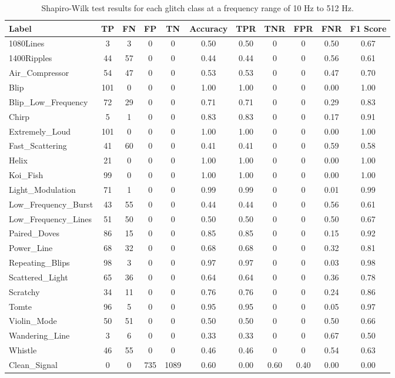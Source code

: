 \documentclass[12pt]{article}
\begin{document}
\begin{table}[H]
  \begin{tabular}{lcccccccccc}
  \toprule
  Label & TP & FN & FP & TN & Accuracy & TPR & TNR & FPR & FNR & F1 Score \\
  \midrule
  1080Lines & 3 & 3 & 0 & 0 & 0.50 & 0.50 & 0 & 0 & 0.50  & 0.67 \\
  1400Ripples & 44 & 57 & 0 & 0 & 0.44 & 0.44 & 0 & 0 & 0.56  & 0.61 \\
  Air\_Compressor & 54 & 47 & 0 & 0 & 0.53 & 0.53 & 0 & 0 & 0.47  & 0.70 \\
  Blip & 101 & 0 & 0 & 0 & 1.00 & 1.00 & 0 & 0 & 0.00  & 1.00 \\
  Blip\_Low\_Frequency & 72 & 29 & 0 & 0 & 0.71 & 0.71 & 0 & 0 & 0.29  & 0.83 \\
  Chirp & 5 & 1 & 0 & 0 & 0.83 & 0.83 & 0 & 0 & 0.17  & 0.91 \\
  Extremely\_Loud & 101 & 0 & 0 & 0 & 1.00 & 1.00 & 0 & 0 & 0.00  & 1.00 \\
  Fast\_Scattering & 41 & 60 & 0 & 0 & 0.41 & 0.41 & 0 & 0 & 0.59  & 0.58 \\
  Helix & 21 & 0 & 0 & 0 & 1.00 & 1.00 & 0 & 0 & 0.00  & 1.00 \\
  Koi\_Fish & 99 & 0 & 0 & 0 & 1.00 & 1.00 & 0 & 0 & 0.00  & 1.00 \\
  Light\_Modulation & 71 & 1 & 0 & 0 & 0.99 & 0.99 & 0 & 0 & 0.01  & 0.99 \\
  Low\_Frequency\_Burst & 43 & 55 & 0 & 0 & 0.44 & 0.44 & 0 & 0 & 0.56  & 0.61 \\
  Low\_Frequency\_Lines & 51 & 50 & 0 & 0 & 0.50 & 0.50 & 0 & 0 & 0.50  & 0.67 \\
  Paired\_Doves & 86 & 15 & 0 & 0 & 0.85 & 0.85 & 0 & 0 & 0.15  & 0.92 \\
  Power\_Line & 68 & 32 & 0 & 0 & 0.68 & 0.68 & 0 & 0 & 0.32  & 0.81 \\
  Repeating\_Blips & 98 & 3 & 0 & 0 & 0.97 & 0.97 & 0 & 0 & 0.03  & 0.98 \\
  Scattered\_Light & 65 & 36 & 0 & 0 & 0.64 & 0.64 & 0 & 0 & 0.36  & 0.78 \\
  Scratchy & 34 & 11 & 0 & 0 & 0.76 & 0.76 & 0 & 0 & 0.24  & 0.86 \\
  Tomte & 96 & 5 & 0 & 0 & 0.95 & 0.95 & 0 & 0 & 0.05 & 0.97 \\
  Violin\_Mode & 50 & 51 & 0 & 0 & 0.50 & 0.50 & 0 & 0 & 0.50 & 0.66 \\
  Wandering\_Line & 3 & 6 & 0 & 0 & 0.33 & 0.33 & 0 & 0 & 0.67 & 0.50 \\
  Whistle & 46 & 55 & 0 & 0 & 0.46 & 0.46 & 0 & 0 & 0.54 & 0.63 \\
  Clean\_Signal & 0 & 0 & 735 & 1089 & 0.60 & 0.00 & 0.60 & 0.40 & 0.00 & 0.00 \\
  \bottomrule
  \end{tabular}
  \caption{Shapiro-Wilk test results for each glitch class at a frequency range of 10 Hz to 512 Hz.}
  \label{tab:shapiro_low_frequency_results}
\end{table}
\end{document}
